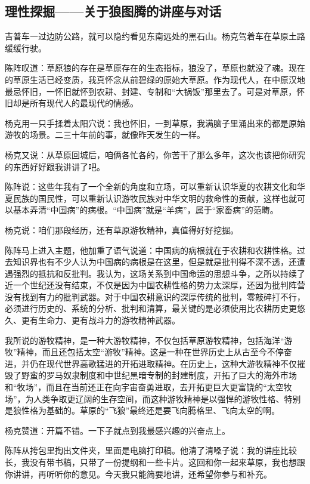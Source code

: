 \subsection*{理性探掘——关于狼图腾的讲座与对话}


\par 吉普车一过边防公路，就可以隐约看见东南远处的黑石山。杨克驾着车在草原土路缓缓行驶。
\par 陈阵叹道：草原狼的存在是草原存在的生态指标，狼没了，草原也就没了魂。现在的草原生活已经变质，我真怀念从前碧绿的原始大草原。作为现代人，在中原汉地最忌怀旧，一怀旧就怀到农耕、封建、专制和“大锅饭”那里去了。可是对草原，怀旧却是所有现代人的最现代的情感。
\par 杨克用一只手揉着太阳穴说：我也怀旧，一到草原，我满脑子里涌出来的都是原始游牧的场景。二三十年前的事，就像昨天发生的一样。
\par 杨克又说：从草原回城后，咱俩各忙各的，你苦干了那么多年，这次也该把你研究的东西好好跟我讲讲了吧。
\par 陈阵说：这些年我有了一个全新的角度和立场，可以重新认识华夏的农耕文化和华夏民族的国民性，可以重新认识游牧民族对中华文明的救命性的贡献，这样也就可以基本弄清“中国病”的病根。“中国病”就是“羊病”，属于“家畜病”的范畴。
\par 杨克说：咱们那段经历，还有草原游牧精神，真值得好好挖掘。
\par 陈阵马上进入主题，他加重了语气说道：中国病的病根就在于农耕和农耕性格。过去知识界也有不少人认为中国病的病根是在这里，但是就是批判得不深不透，还遭遇强烈的抵抗和反批判。我认为，这场关系到中国命运的思想斗争，之所以持续了近一个世纪还没有结束，不仅是因为中国农耕性格的势力太深厚，还因为批判阵营没有找到有力的批判武器。对于中国农耕意识的深厚传统的批判，零敲碎打不行，必须进行历史的、系统的分析、批判和清算，最关键的是必须使用比农耕历史更悠久、更有生命力、更有战斗力的游牧精神武器。
\par 我所说的游牧精神，是一种大游牧精神，不仅包括草原游牧精神，包括海洋“游牧”精神，而且还包括太空“游牧”精神。这是一种在世界历史上从古至今不停奋进，并仍在现代世界高歌猛进的开拓进取精神。在历史上，这种大游牧精神不仅摧毁了野蛮的罗马奴隶制度和中世纪黑暗专制的封建制度，开拓了巨大的海外市场和“牧场”，而且在当前还正在向宇宙奋勇进取，去开拓更巨大更富饶的“太空牧场”，为人类争取更辽阔的生存空间，而这种游牧精神是以强悍的游牧性格、特别是狼性格为基础的。草原的“飞狼”最终还是要飞向腾格里、飞向太空的啊。
\par 杨克赞道：开篇不错。一下子就点到我最感兴趣的兴奋点上。
\par 陈阵从挎包里掏出文件夹，里面是电脑打印稿。他清了清嗓子说：我的讲座比较长，我没有带书稿，只带了一份提纲和一些卡片。这回和你一起来草原，我也想跟你讲讲，再听听你的意见。今天我只能简要地讲，还希望你参与和补充。
